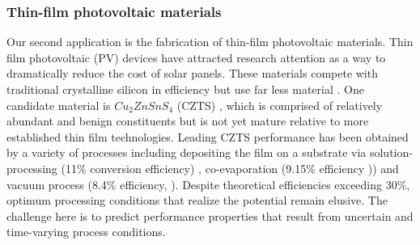 \documentclass[11pt]{article}
\begin{document}

\subsubsection*{Thin-film photovoltaic materials}
Our second  application 
is the fabrication of thin-film photovoltaic
materials. 
Thin film photovoltaic (PV) devices have attracted research attention
as a way to dramatically reduce the cost of solar panels. These
materials compete with traditional crystalline silicon in efficiency but use far less
material \cite{JiangY13}. 
One candidate material is $Cu_2ZnSnS_4$ (CZTS) \cite{JiangY13}, which is
comprised of relatively abundant and benign constituents but is not yet mature relative to more established thin film technologies. 
Leading  CZTS  performance has been obtained by a variety of processes including depositing the film on a substrate via
solution-processing (11\% conversion efficiency) \cite{Todorov13},
co-evaporation (9.15\% efficiency \cite{Repins12})) and vacuum
process (8.4\% efficiency, \cite{Shin11}). Despite theoretical
efficiencies exceeding 30\%,  optimum processing conditions
that realize the potential remain elusive.
The challenge here is to 
predict performance properties that result from uncertain and time-varying process
conditions.
\end{document}
